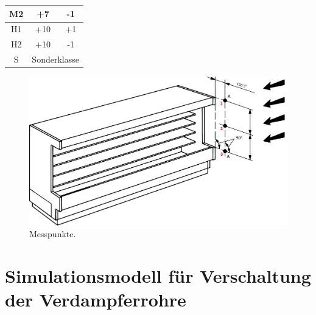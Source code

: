 \begin{table}[h!]
\begin{tabular}{|c|c|c|}
M2              & +7                                                                                                                         & -1                                                                                                                         \\ \hline
H1              & +10                                                                                                                        & +1                                                                                                                         \\ \hline
H2              & +10                                                                                                                        & -1                                                                                                                         \\ \hline
S               & \multicolumn{2}{c|}{Sonderklasse}                                                                                                                                                                                                                       \\ \hline
\end{tabular}
\end{table}




\begin{figure}[h!tb]
\centering
\includegraphics[scale=.5]{Pictures/idc_meas2.pdf}
\caption{Messpunkte.}
\label{fig:Messpunkte}
\end{figure}

\clearpage

\section{Simulationsmodell für Verschaltung der Verdampferrohre}
\label{sec:Simulationsmodell}

